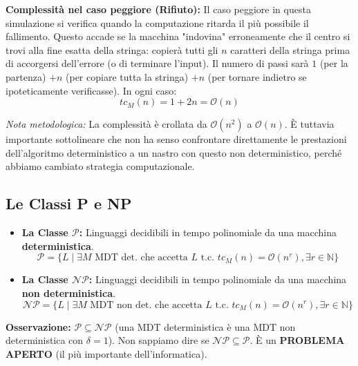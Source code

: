 \vspace{0.4cm}
\textbf{Complessità nel caso peggiore (Rifiuto):} 
Il caso peggiore in questa simulazione si verifica quando la computazione ritarda il più possibile il fallimento. Questo accade se la macchina "indovina" erroneamente che il centro si trovi alla fine esatta della stringa: copierà tutti gli $n$ caratteri della stringa prima di accorgersi dell'errore (o di terminare l'input).
Il numero di passi sarà $1$ (per la partenza) $+ n$ (per copiare tutta la stringa) $+ n$ (per tornare indietro se ipoteticamente verificasse).
In ogni caso:
$$ tc_M(n) = 1 + 2n = \mathcal{O}(n) $$

\textit{Nota metodologica:} La complessità è crollata da $\mathcal{O}(n^2)$ a $\mathcal{O}(n)$. È tuttavia importante sottolineare che non ha senso confrontare direttamente le prestazioni dell'algoritmo deterministico a un nastro con questo non deterministico, perché abbiamo cambiato strategia computazionale.

\vspace{0.5cm}

\subsection{Le Classi P e NP}

\begin{itemize}
    \item \textbf{La Classe $\mathcal{P}$:} Linguaggi decidibili in tempo polinomiale da una macchina \textbf{deterministica}.
    $$ \mathcal{P} = \{ L \mid \exists M \text{ MDT det. che accetta } L \text{ t.c. } tc_M(n) = \mathcal{O}(n^r), \exists r \in \mathbb{N} \} $$

    \vspace{0.2cm}
    \item \textbf{La Classe $\mathcal{NP}$:} Linguaggi decidibili in tempo polinomiale da una macchina \textbf{non deterministica}.
    $$ \mathcal{NP} = \{ L \mid \exists M \text{ MDT non det. che accetta } L \text{ t.c. } tc_M(n) = \mathcal{O}(n^r), \exists r \in \mathbb{N} \} $$
\end{itemize}

\textbf{Osservazione:} $\mathcal{P} \subseteq \mathcal{NP}$ (una MDT deterministica è una MDT non deterministica con $\delta = 1$). Non sappiamo dire se $\mathcal{NP} \subseteq \mathcal{P}$. È un \textbf{PROBLEMA APERTO} (il più importante dell'informatica).

\vspace{0.6cm}



